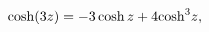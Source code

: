 \[\mathop{\cosh\/}\nolimits\!\left(3z\right)=-3\mathop{\cosh\/}\nolimits z+4{%
\mathop{\cosh\/}\nolimits^{3}}z,\]